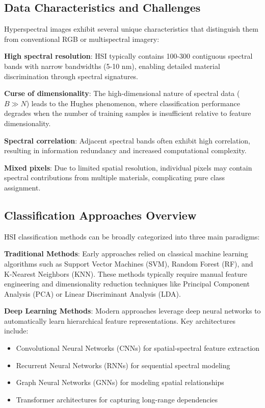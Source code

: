 \documentclass[journal]{IEEEtran}
\begin{document}
\subsection{Data Characteristics and Challenges}

Hyperspectral images exhibit several unique characteristics that distinguish them from conventional RGB or multispectral imagery:

\textbf{High spectral resolution}: HSI typically contains 100-300 contiguous spectral bands with narrow bandwidths (5-10 nm), enabling detailed material discrimination through spectral signatures.

\textbf{Curse of dimensionality}: The high-dimensional nature of spectral data ($B \gg N$) leads to the Hughes phenomenon, where classification performance degrades when the number of training samples is insufficient relative to feature dimensionality.

\textbf{Spectral correlation}: Adjacent spectral bands often exhibit high correlation, resulting in information redundancy and increased computational complexity.

\textbf{Mixed pixels}: Due to limited spatial resolution, individual pixels may contain spectral contributions from multiple materials, complicating pure class assignment.

\subsection{Classification Approaches Overview}

HSI classification methods can be broadly categorized into three main paradigms:

\textbf{Traditional Methods}: Early approaches relied on classical machine learning algorithms such as Support Vector Machines (SVM), Random Forest (RF), and K-Nearest Neighbors (KNN). These methods typically require manual feature engineering and dimensionality reduction techniques like Principal Component Analysis (PCA) or Linear Discriminant Analysis (LDA).

\textbf{Deep Learning Methods}: Modern approaches leverage deep neural networks to automatically learn hierarchical feature representations. Key architectures include:
\begin{itemize}
\item Convolutional Neural Networks (CNNs) for spatial-spectral feature extraction
\item Recurrent Neural Networks (RNNs) for sequential spectral modeling
\item Graph Neural Networks (GNNs) for modeling spatial relationships
\item Transformer architectures for capturing long-range dependencies
\end{itemize}
\end{document}
